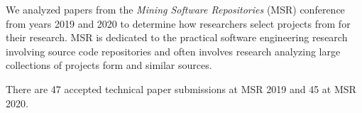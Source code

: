 We analyzed papers from the \emph{Mining Software Repositories} (MSR) conference
from years 2019 and 2020 to determine how researchers select projects from \gh
for their research. MSR is dedicated to the practical software engineering
research involving source code repositories and often involves research analyzing 
large collections of projects form \gh and similar sources.

There are 47 accepted technical paper submissions at MSR 2019 and 45 at MSR 2020.




% 

